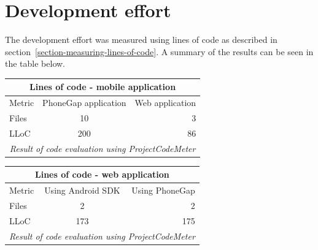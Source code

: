 \section{Development effort}\label{sec:development-effort}
The development effort was measured using lines of code as described in section~\ref{section-measuring-lines-of-code}. A summary of the results can be seen in the table below.

\begin{tabular}{ | l | c | r | }
    \hline
    \multicolumn{3}{|c|}{Lines of code - mobile application} \\
    \hline
	Metric & PhoneGap application &  Web application \\
	\hline
	Files & 10 & 3\\
	LLoC & 200 & 86\\	
	\hline
	\multicolumn{3}{c}{\emph{Result of code evaluation using ProjectCodeMeter}}
\end{tabular}

\begin{tabular}{ | l | c | r | }
    \hline
    \multicolumn{3}{|c|}{Lines of code - web application} \\
    \hline
	Metric & Using Android SDK & Using PhoneGap \\
	\hline
	Files & 2 & 2 \\
	LLoC & 173 & 175 \\	
	\hline
	\multicolumn{3}{c}{\emph{Result of code evaluation using ProjectCodeMeter}}
\end{tabular}

